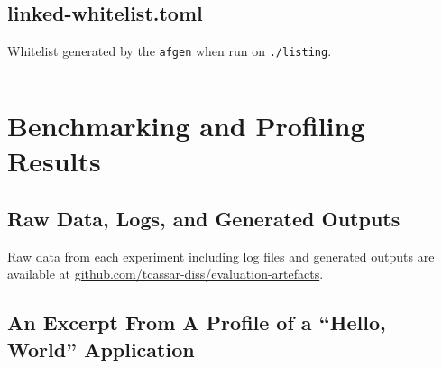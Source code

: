 
\subsection{linked-whitelist.toml}
\begin{listing}[H]
    \caption{Whitelist generated by the \texttt{afgen} when run on
    \texttt{./listing}.}
    \label{lst:whitelist-toml} %
    \inputminted[fontsize=\small, frame=single, linenos]{toml}{./listings/linkage/linked-whitelist.toml}
\end{listing}

\clearpage

\section{Benchmarking and Profiling Results}

\subsection{Raw Data, Logs, and Generated Outputs}\label{apx:eval-artefacts}
Raw data from each experiment including log files and generated outputs are
available at
\href{https://github.com/tcassar-diss/evaluation-artefacts}{github.com/tcassar-diss/evaluation-artefacts}.

\subsection{An Excerpt From A Profile of a ``Hello, World'' Application}


